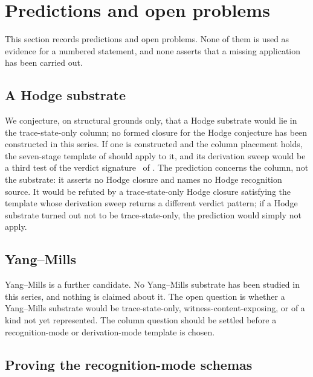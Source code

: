 \section{Predictions and open problems}\label{sec:predictions}

This section records predictions and open problems.  None of them is
used as evidence for a numbered statement, and none asserts that a
missing application has been carried out.

\subsection{A Hodge substrate}
\label{sec:predictions:hodge}

We conjecture, on structural grounds only, that a Hodge substrate
\cite{Deligne2000Hodge,Voisin2003HodgeTheoryII} would lie in the
trace-state-only column; no formed closure for the Hodge conjecture has
been constructed in this series.  If one is constructed and the column
placement holds, the seven-stage template of 
should apply to it, and its derivation sweep would be a third test of
the verdict signature \SigPattern\ of .
The prediction concerns the column, not the substrate: it asserts no
Hodge closure and names no Hodge recognition source.  It would be
refuted by a trace-state-only Hodge closure satisfying the template
whose derivation sweep returns a different verdict pattern; if a Hodge
substrate turned out not to be trace-state-only, the prediction would
simply not apply.

\subsection{Yang--Mills}
\label{sec:predictions:ym}

Yang--Mills \cite{JaffeWitten2000YangMills} is a further candidate.
No Yang--Mills substrate has been studied in this series, and nothing
is claimed about it.  The open question is whether a Yang--Mills
substrate would be trace-state-only, witness-content-exposing, or of a
kind not yet represented.  The column question should be settled before
a recognition-mode or derivation-mode template is chosen.

\subsection{Proving the recognition-mode schemas}
\label{sec:predictions:theorem-grade-lifting}

